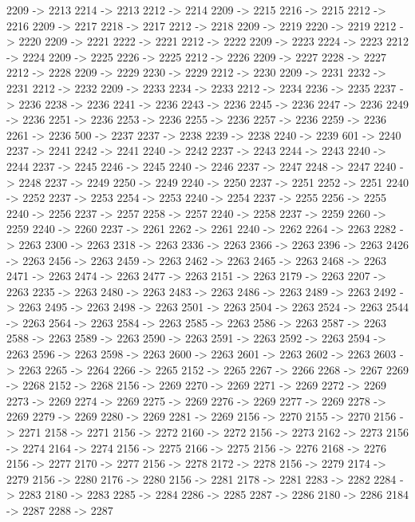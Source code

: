 {	2209 -> 2213
	2214 -> 2213
	2212 -> 2214
	2209 -> 2215
	2216 -> 2215
	2212 -> 2216
	2209 -> 2217
	2218 -> 2217
	2212 -> 2218
	2209 -> 2219
	2220 -> 2219
	2212 -> 2220
	2209 -> 2221
	2222 -> 2221
	2212 -> 2222
	2209 -> 2223
	2224 -> 2223
	2212 -> 2224
	2209 -> 2225
	2226 -> 2225
	2212 -> 2226
	2209 -> 2227
	2228 -> 2227
	2212 -> 2228
	2209 -> 2229
	2230 -> 2229
	2212 -> 2230
	2209 -> 2231
	2232 -> 2231
	2212 -> 2232
	2209 -> 2233
	2234 -> 2233
	2212 -> 2234
	2236 -> 2235
	2237 -> 2236
	2238 -> 2236
	2241 -> 2236
	2243 -> 2236
	2245 -> 2236
	2247 -> 2236
	2249 -> 2236
	2251 -> 2236
	2253 -> 2236
	2255 -> 2236
	2257 -> 2236
	2259 -> 2236
	2261 -> 2236
	500 -> 2237
	2237 -> 2238
	2239 -> 2238
	2240 -> 2239
	601 -> 2240
	2237 -> 2241
	2242 -> 2241
	2240 -> 2242
	2237 -> 2243
	2244 -> 2243
	2240 -> 2244
	2237 -> 2245
	2246 -> 2245
	2240 -> 2246
	2237 -> 2247
	2248 -> 2247
	2240 -> 2248
	2237 -> 2249
	2250 -> 2249
	2240 -> 2250
	2237 -> 2251
	2252 -> 2251
	2240 -> 2252
	2237 -> 2253
	2254 -> 2253
	2240 -> 2254
	2237 -> 2255
	2256 -> 2255
	2240 -> 2256
	2237 -> 2257
	2258 -> 2257
	2240 -> 2258
	2237 -> 2259
	2260 -> 2259
	2240 -> 2260
	2237 -> 2261
	2262 -> 2261
	2240 -> 2262
	2264 -> 2263
	2282 -> 2263
	2300 -> 2263
	2318 -> 2263
	2336 -> 2263
	2366 -> 2263
	2396 -> 2263
	2426 -> 2263
	2456 -> 2263
	2459 -> 2263
	2462 -> 2263
	2465 -> 2263
	2468 -> 2263
	2471 -> 2263
	2474 -> 2263
	2477 -> 2263
	2151 -> 2263
	2179 -> 2263
	2207 -> 2263
	2235 -> 2263
	2480 -> 2263
	2483 -> 2263
	2486 -> 2263
	2489 -> 2263
	2492 -> 2263
	2495 -> 2263
	2498 -> 2263
	2501 -> 2263
	2504 -> 2263
	2524 -> 2263
	2544 -> 2263
	2564 -> 2263
	2584 -> 2263
	2585 -> 2263
	2586 -> 2263
	2587 -> 2263
	2588 -> 2263
	2589 -> 2263
	2590 -> 2263
	2591 -> 2263
	2592 -> 2263
	2594 -> 2263
	2596 -> 2263
	2598 -> 2263
	2600 -> 2263
	2601 -> 2263
	2602 -> 2263
	2603 -> 2263
	2265 -> 2264
	2266 -> 2265
	2152 -> 2265
	2267 -> 2266
	2268 -> 2267
	2269 -> 2268
	2152 -> 2268
	2156 -> 2269
	2270 -> 2269
	2271 -> 2269
	2272 -> 2269
	2273 -> 2269
	2274 -> 2269
	2275 -> 2269
	2276 -> 2269
	2277 -> 2269
	2278 -> 2269
	2279 -> 2269
	2280 -> 2269
	2281 -> 2269
	2156 -> 2270
	2155 -> 2270
	2156 -> 2271
	2158 -> 2271
	2156 -> 2272
	2160 -> 2272
	2156 -> 2273
	2162 -> 2273
	2156 -> 2274
	2164 -> 2274
	2156 -> 2275
	2166 -> 2275
	2156 -> 2276
	2168 -> 2276
	2156 -> 2277
	2170 -> 2277
	2156 -> 2278
	2172 -> 2278
	2156 -> 2279
	2174 -> 2279
	2156 -> 2280
	2176 -> 2280
	2156 -> 2281
	2178 -> 2281
	2283 -> 2282
	2284 -> 2283
	2180 -> 2283
	2285 -> 2284
	2286 -> 2285
	2287 -> 2286
	2180 -> 2286
	2184 -> 2287
	2288 -> 2287
}
